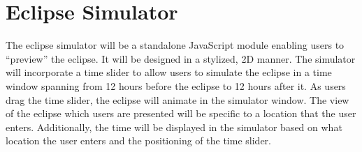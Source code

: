 \documentclass[10pt, onecolumn, draftclsnofoot, letterpaper, compsoc]{IEEEtran}
\begin{document}
\section{Eclipse Simulator}
The eclipse simulator will be a standalone JavaScript module enabling users to
“preview” the eclipse. It will be designed in a stylized, 2D manner.
The simulator will incorporate a time slider to allow users to simulate
the eclipse in a time window spanning from 12 hours before the eclipse to 12
hours after it. As users drag the time slider, the eclipse will animate in the
simulator window. The view of the eclipse which users are presented will be 
specific to a location that the user enters. Additionally, the time will be
displayed in the simulator based on what location the user enters and the
positioning of the time slider.



\end{document}
